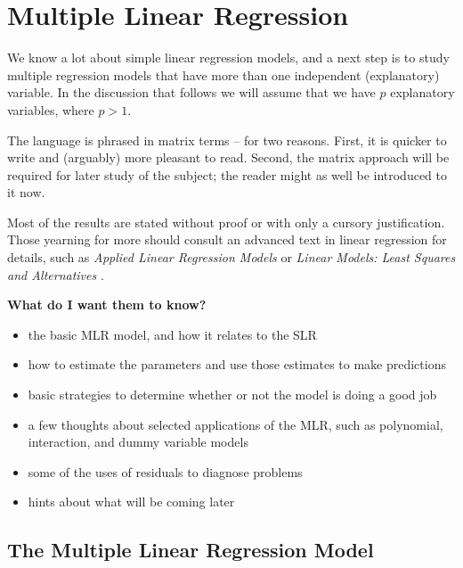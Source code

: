 \chapter{Multiple Linear Regression}
\label{sec-12}

\noindent
We know a lot about simple linear regression models, and a next step
is to study multiple regression models that have more than one
independent (explanatory) variable. In the discussion that follows we
will assume that we have \(p\) explanatory variables, where \(p > 1\).

The language is phrased in matrix terms -- for two reasons. First, it
is quicker to write and (arguably) more pleasant to read. Second, the
matrix approach will be required for later study of the subject; the
reader might as well be introduced to it now.

Most of the results are stated without proof or with only a cursory
justification. Those yearning for more should consult an advanced text
in linear regression for details, such as \emph{Applied Linear Regression
Models} \cite{Neter1996} or \emph{Linear Models: Least Squares and
Alternatives} \cite{Rao1999}.

\textbf{What do I want them to know?}
\begin{itemize}
\item the basic MLR model, and how it relates to the SLR
\item how to estimate the parameters and use those estimates to make
predictions
\item basic strategies to determine whether or not the model is doing a
good job
\item a few thoughts about selected applications of the MLR, such as
polynomial, interaction, and dummy variable models
\item some of the uses of residuals to diagnose problems
\item hints about what will be coming later
\end{itemize}

\section{The Multiple Linear Regression Model}
\label{sec-12-1}

